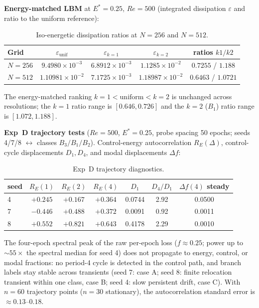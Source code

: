 \documentclass[11pt]{article}
\begin{document}
\textbf{Energy-matched LBM} at $E^*=0.25$, $Re=500$ (integrated dissipation
$\varepsilon$ and ratio to the uniform reference):

\begin{table}[h]
\centering\small
\caption{Iso-energetic dissipation ratios at $N=256$ and $N=512$.}
\label{tab:S11a}
\begin{tabular}{lcccc}
\toprule
Grid & $\varepsilon_{\mathrm{unif}}$ & $\varepsilon_{k=1}$ & $\varepsilon_{k=2}$ & ratios $k1/k2$\\
\midrule
$N=256$ & $9.4980\times10^{-3}$ & $6.8912\times10^{-3}$ & $1.1285\times10^{-2}$ & $0.7255$ / $1.188$\\
$N=512$ & $1.10981\times10^{-2}$ & $7.1725\times10^{-3}$ & $1.18987\times10^{-2}$ & $0.6463$ / $1.0721$\\
\bottomrule
\end{tabular}
\end{table}

The energy-matched ranking $k=1<\mathrm{uniform}<k=2$ is unchanged across
resolutions; the $k=1$ ratio range is $[0.646,0.726]$ and the
$k=2$ ($B_1$) ratio range is $[1.072,1.188]$.

\textbf{Exp~D trajectory tests} ($Re=500$, $E^*=0.25$, probe spacing 50 epochs;
seeds 4/7/8 $\leftrightarrow$ classes $B_3/B_1/B_2$). Control-energy
autocorrelation $R_E(\Delta)$, control-cycle displacements $D_1,D_4$, and
modal displacements $\Delta f$:

\begin{table}[h]
\centering\small
\caption{Exp~D trajectory diagnostics.}
\label{tab:S11b}
\begin{tabular}{lcccccc}
\toprule
seed & $R_E(1)$ & $R_E(2)$ & $R_E(4)$ & $D_1$ & $D_4/D_1$ & $\Delta f(4)$ steady\\
\midrule
4 & $+0.245$ & $+0.167$ & $+0.364$ & 0.0744 & 2.92 & 0.0500\\
7 & $-0.446$ & $+0.488$ & $+0.372$ & 0.0091 & 0.92 & 0.0011\\
8 & $+0.552$ & $+0.821$ & $+0.643$ & 0.4178 & 2.29 & 0.0010\\
\bottomrule
\end{tabular}
\end{table}

The four-epoch spectral peak of the raw per-epoch loss ($f\approx0.25$;
power up to $\sim55\times$ the spectral median for seed 4) does not propagate
to energy, control, or modal fractions: no period-4 cycle is detected in the
control path, and branch labels stay stable across transients (seed 7:
case A; seed 8: finite relocation transient within one class, case B; seed 4:
slow persistent drift, case C). With $n=60$ trajectory points
($n=30$ stationary), the autocorrelation standard error is
$\approx0.13$--$0.18$.
\end{document}
